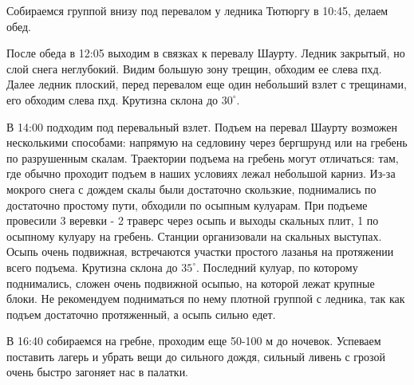 Собираемся группой внизу под перевалом у ледника Тютюргу в 10:45, делаем обед.

После обеда в 12:05 выходим в связках к перевалу Шаурту. Ледник закрытый, но слой снега неглубокий. Видим большую зону трещин, обходим ее слева пхд. Далее ледник плоский, перед перевалом еще один небольший взлет с трещинами, его обходим слева пхд. Крутизна склона до $30^\circ$.

В 14:00 подходим под перевальный взлет. Подъем на перевал Шаурту возможен несколькими способами: напрямую на седловину через бергшрунд или на гребень по разрушенным скалам. Траектории подъема на гребень могут отличаться: там, где обычно проходит подъем в наших условиях лежал небольшой карниз. Из-за мокрого снега с дождем скалы были достаточно скользкие, поднимались по достаточно простому пути, обходили по осыпным кулуарам. При подъеме провесили 3 веревки - 2 траверс через осыпь и выходы скальных плит, 1 по осыпному кулуару на гребень. Станции организовали на скальных
выступах. Осыпь очень подвижная, встречаются участки простого лазанья на протяжении всего подъема. Крутизна склона до $35^\circ$. Последний кулуар, по которому поднимались, сложен очень подвижной осыпью, на которой лежат крупные блоки. Не рекомендуем подниматься по нему плотной группой с ледника, так как подъем достаточно протяженный, а осыпь сильно едет.

В 16:40 собираемся на гребне, проходим еще 50-100 м до ночевок. Успеваем поставить лагерь и убрать вещи до сильного дождя, сильный ливень с грозой очень быстро загоняет нас в палатки.









